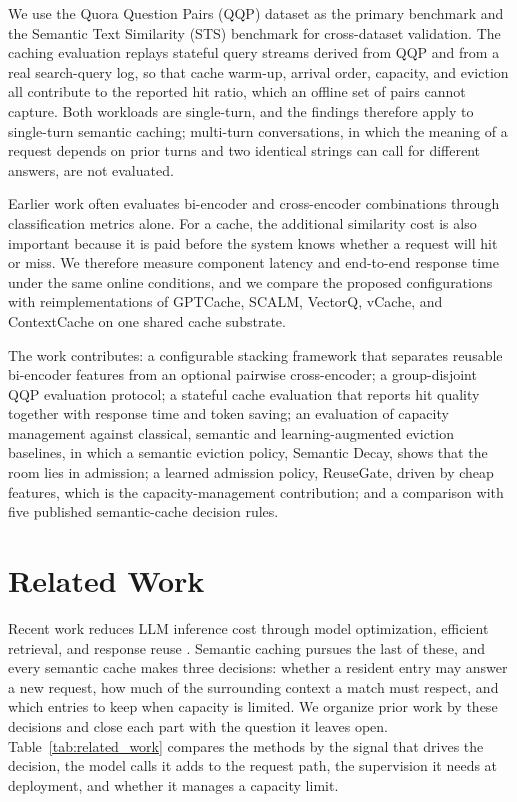 \documentclass[authoryear,preprint,review,12pt]{elsarticle}
\begin{document}
We use the Quora Question Pairs (QQP) dataset \citep{iyer2017quora} as the primary benchmark and the Semantic Text Similarity (STS) benchmark \citep{cer2017semeval} for cross-dataset validation. The caching evaluation replays stateful query streams derived from QQP and from a real search-query log, so that cache warm-up, arrival order, capacity, and eviction all contribute to the reported hit ratio, which an offline set of pairs cannot capture. Both workloads are single-turn, and the findings therefore apply to single-turn semantic caching; multi-turn conversations, in which the meaning of a request depends on prior turns and two identical strings can call for different answers, are not evaluated.

Earlier work often evaluates bi-encoder and cross-encoder combinations through classification metrics alone. For a cache, the additional similarity cost is also important because it is paid before the system knows whether a request will hit or miss. We therefore measure component latency and end-to-end response time under the same online conditions, and we compare the proposed configurations with reimplementations of GPTCache, SCALM, VectorQ, vCache, and ContextCache on one shared cache substrate.

The work contributes: a configurable stacking framework that separates reusable bi-encoder features from an optional pairwise cross-encoder; a group-disjoint QQP evaluation protocol; a stateful cache evaluation that reports hit quality together with response time and token saving; an evaluation of capacity management against classical, semantic and learning-augmented eviction baselines, in which a semantic eviction policy, Semantic Decay, shows that the room lies in admission; a learned admission policy, ReuseGate, driven by cheap features, which is the capacity-management contribution; and a comparison with five published semantic-cache decision rules.

\section{Related Work}
\label{sec:related_work}
Recent work reduces LLM inference cost through model optimization, efficient retrieval, and response reuse \citep{guo2025deep,naderi2025large,gebreab2025llm,cremaschi2025decoding}. Semantic caching pursues the last of these, and every semantic cache makes three decisions: whether a resident entry may answer a new request, how much of the surrounding context a match must respect, and which entries to keep when capacity is limited. We organize prior work by these decisions and close each part with the question it leaves open. Table~\ref{tab:related_work} compares the methods by the signal that drives the decision, the model calls it adds to the request path, the supervision it needs at deployment, and whether it manages a capacity limit.
\end{document}
